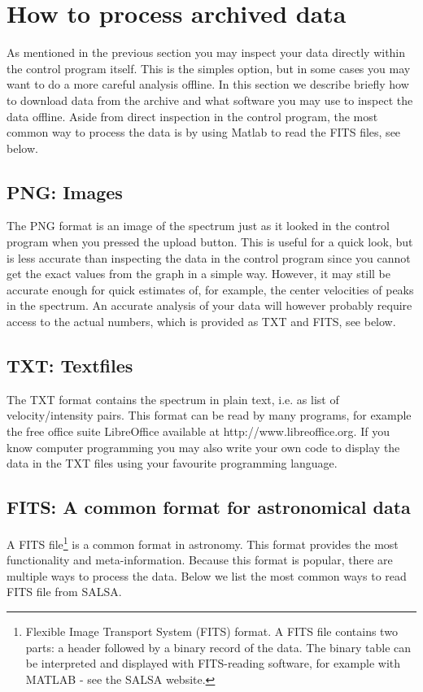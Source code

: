 \section{How to process archived data}
\label{sect:archiveprocess}
As mentioned in the previous section you may inspect your data directly within
the control program itself. This is the simples option, but in some cases you
may want to do a more careful analysis offline. In this section we describe
briefly how to download data from the archive and what software you may use to
inspect the data offline. Aside from direct inspection in the control program,
the most common way to process the data is by using Matlab to read the FITS
files, see below.

\subsection{PNG: Images}
The PNG format is an image of the spectrum just as it looked in the control
program when you pressed the upload button. This is useful for a quick look,
but is less accurate than inspecting the data in the control program since you
cannot get the exact values from the graph in a simple way. However, it may
still be accurate enough for quick estimates of, for example, the center
velocities of peaks in the spectrum. An accurate analysis of your data will
however probably require access to the actual numbers, which is provided
as TXT and FITS, see below.

\subsection{TXT: Textfiles}
The TXT format contains the spectrum in plain text, i.e. as list of
velocity/intensity pairs. This format can be read by many programs, for example
the free office suite LibreOffice available at http://www.libreoffice.org.  If
you know computer programming you may also write your own code to display the
data in the TXT files using your favourite programming language.

\subsection{FITS: A common format for astronomical data}
A FITS file\footnote{Flexible Image Transport System (FITS) format.  A FITS
file contains two parts: a header followed by a binary record of the data.  The
binary table can be interpreted and displayed with FITS-reading software, for
example with MATLAB - see the SALSA website.} is a common format in astronomy.
This format provides the most functionality and meta-information. Because this 
format is popular, there are multiple ways to process the data. Below we list
the most common ways to read FITS file from SALSA.

